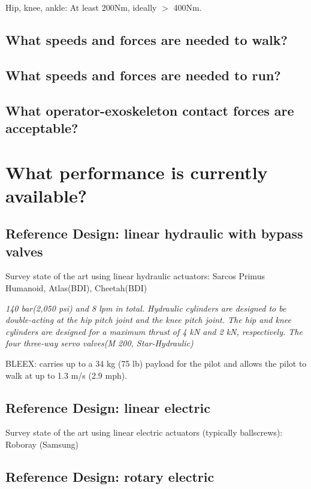 \documentclass[letterpaper,12pt,fullpage]{article}
\begin{document}
Hip, knee, ankle: At least 200Nm, ideally $>$ 400Nm.

\subsection{What speeds and forces are needed to walk?}

\subsection{What speeds and forces are needed to run?}

\subsection{What operator-exoskeleton contact forces are acceptable?}

\section{What performance is currently available?}

\subsection{Reference Design: linear hydraulic with bypass valves}

Survey state of the art using linear hydraulic actuators:
Sarcos Primus Humanoid, Atlas(BDI), Cheetah(BDI)

{\it 140 bar(2,050 psi) and 8 lpm in total. Hydraulic cylinders
are designed to be double-acting at the hip pitch joint and
the knee pitch joint. The hip and knee cylinders are designed
for a maximum thrust of 4 kN and 2 kN, respectively. The
four three-way servo valves(M 200, Star-Hydraulic)}~\cite{IEEE07222598}

BLEEX: carries
up to a 34 kg (75 lb) payload for the pilot and allows the pilot to
walk at up to 1.3 m/s (2.9 mph).

\subsection{Reference Design: linear electric}

Survey state of the art using linear electric actuators (typically ballscrews):
Roboray (Samsung)

\subsection{Reference Design: rotary electric}
\end{document}

